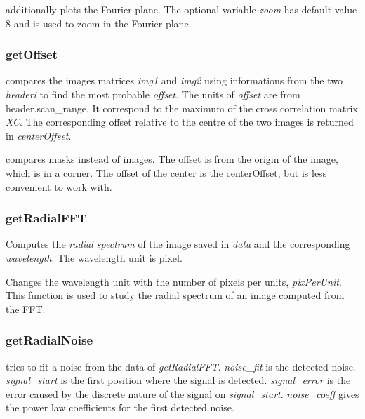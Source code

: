  additionally plots the Fourier plane. The optional variable \emph{zoom} has default value $8$ and is used to zoom in the Fourier plane.
\edf
\subsubsection{getOffset}
\bdf
{} compares the images matrices \emph{img1} and \emph{img2} using informations from the two \emph{headeri} to find the most probable \emph{offset}. The units of \emph{offset} are from header.scan\_range. It correspond to the maximum of the cross correlation matrix \emph{XC}. The corresponding offset relative to the centre of the two images is returned in \emph{centerOffset}.

 compares masks instead of images.
\edf
The offset is from the origin of the image, which is in a corner. The offset of the center is the centerOffset, but is less convenient to work with.
\subsubsection{getRadialFFT}
\bdf
{} Computes the \emph{radial spectrum} of the image saved in \emph{data} and the corresponding \emph{wavelength}. The wavelength unit is pixel.

 Changes the wavelength unit with the number of pixels per units, \emph{pixPerUnit}.
\edf
This function is used to study the radial spectrum of an image computed from the FFT.
\subsubsection{getRadialNoise}
\bdf
{} tries to fit a noise from the data of \emph{getRadialFFT}. \emph{noise\_fit} is the detected noise. \emph{signal\_start} is the first position where the signal is detected. \emph{signal\_error} is the error caused by the discrete nature of the signal on \emph{signal\_start}. \emph{noise\_coeff} gives the power law coefficients for the first detected noise.

